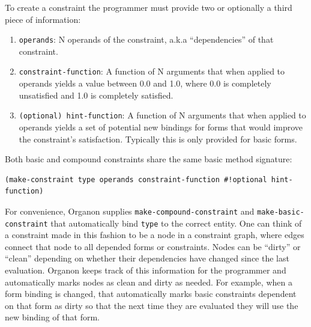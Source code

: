 \documentclass[12pt,a4paper]{article}
\begin{document}
To create a constraint the programmer must provide two or optionally a third piece of information:
\begin{enumerate}

\item \texttt{operands}: N operands of the constraint, a.k.a ``dependencies'' of that constraint.
\item \texttt{constraint-function}: A function of N arguments that when applied to operands yields a value between 0.0 and 1.0, where 0.0 is completely unsatisfied and 1.0 is completely satisfied.
\item \texttt{(optional) hint-function}: A function of N arguments that when applied to operands yields a set of potential new bindings for forms that would improve the constraint's satisfaction.  Typically this is only provided for basic forms.

\end{enumerate}
Both basic and compound constraints share the same basic method signature:
\begin{lstlisting}
(make-constraint type operands constraint-function #!optional hint-function)

\end{lstlisting}
For convenience, Organon supplies \texttt{make-compound-constraint} and \texttt{make-basic-constraint} that automatically bind \texttt{type} to the correct entity. One can think of a constraint made in this fashion to be a node in a constraint graph, where edges connect that node to all depended forms or constraints.  Nodes can be ``dirty'' or ``clean'' depending on whether their dependencies have changed since the last evaluation.  Organon keeps track of this information for the programmer and automatically marks nodes as clean and dirty as needed.  For example, when a form binding is changed, that automatically marks basic constraints dependent on that form as dirty so that the next time they are evaluated they will use the new binding of that form.
\end{document}
